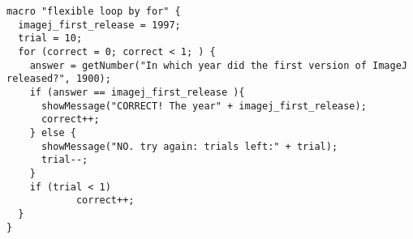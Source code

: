 \begin{lstlisting}[morekeywords={*, for}]
macro "flexible loop by for" {
  imagej_first_release = 1997;
  trial = 10;
  for (correct = 0; correct < 1; ) {
    answer = getNumber("In which year did the first version of ImageJ released?", 1900);
    if (answer == imagej_first_release ){
      showMessage("CORRECT! The year" + imagej_first_release);		
      correct++;
    } else {
      showMessage("NO. try again: trials left:" + trial);
      trial--;
    }
    if (trial < 1)
            correct++;
  }
}


\end{lstlisting}